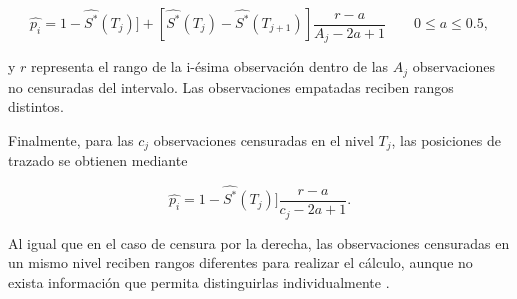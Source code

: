 \begin{enumerate}
\begin{description}
$$\hat{p_i}=1-\widehat{S^*}(T_j)] +
[\widehat{S^*}(T_j)-\widehat{S^*}(T_{j+1})]
\frac{r-a}{A_j-2a+1} \qquad 0\leq a\leq0.5,$$

y $r$ representa el rango de la i-ésima observación dentro de las $A_j$ observaciones no censuradas del intervalo. Las observaciones empatadas reciben rangos distintos.

Finalmente, para las $c_j$ observaciones censuradas en el nivel $T_j$, las posiciones de trazado se obtienen mediante

$$\hat{p_i}=1-\widehat{S^*}(T_j)]
\frac{r-a}{c_j-2a+1}.$$

Al igual que en el caso de censura por la derecha, las observaciones censuradas en un mismo nivel reciben rangos diferentes para realizar el cálculo, aunque no exista información que permita distinguirlas individualmente \cite{EnvStats_ppointsCensored}.
\end{description}
\end{enumerate}
